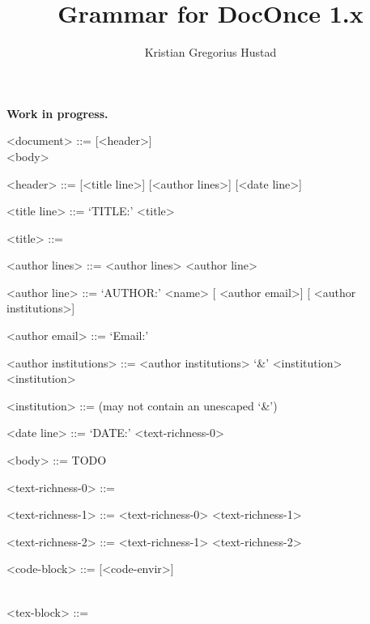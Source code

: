 \documentclass{article}
\begin{document}
\title{Grammar for DocOnce 1.x}
\author{Kristian Gregorius Hustad}
\maketitle

{\bf \color{red} Work in progress.}

\setlength{\grammarparsep}{10pt plus 1pt minus 1pt} %
\setlength{\grammarindent}{12em} %
\begin{grammar}
<document>      ::= [<header>] \\
                    <body>

<header>        ::= [<title line>]
                    [<author lines>]
                    [<date line>]

<title line>    ::= `TITLE:'  <title> 

<title>         ::= 

<author lines>  ::= <author lines> <author line>

<author line>   ::= `AUTHOR:'  <name>
                    [ <author email>]
                    [ <author institutions>]

<author email>  ::= `Email:'  

<author institutions>   ::= <author institutions>  `&'  <institution>
                        \alt <institution>

<institution>  ::=   (may not contain an unescaped `&')

<date line> ::= `DATE:'  <text-richness-0> 

<body> ::= {\color{red} TODO}

<text-richness-0> ::= 

<text-richness-1> ::= <text-richness-0>
                   <text-richness-1>

<text-richness-2> ::= <text-richness-1>
                   <text-richness-2>

<code-block> ::=  [<code-envir>]  \\
                  \\
                  

<tex-block> ::=   \\
                 \\
                 
\end{grammar}
\end{document}
